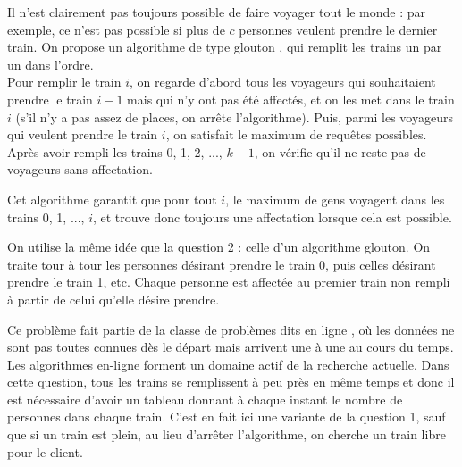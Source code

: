 

\Q
Il n'est clairement pas toujours possible de faire voyager tout le monde : par exemple, ce n'est pas possible si plus de $c$ personnes veulent prendre le dernier train. On propose un algorithme de type \og glouton \fg{}, qui remplit les trains un par un dans l'ordre.\\
Pour remplir le train $i$, on regarde d'abord tous les voyageurs qui souhaitaient prendre le train $i-1$ mais qui n'y ont pas été affectés, et on les met dans le train $i$ (s'il n'y a pas assez de places, on arrête l'algorithme). Puis, parmi les voyageurs qui veulent prendre le train $i$, on satisfait le maximum de requêtes possibles.\\
Après avoir rempli les trains 0, 1, 2, ..., $k-1$, on vérifie qu'il ne reste pas de voyageurs sans affectation.
\smallskip

Cet algorithme garantit que pour tout $i$, le maximum de gens voyagent dans les trains 0, 1, ..., $i$, et trouve donc toujours une affectation lorsque cela est possible.



\Q
On utilise la même idée que la question 2 : celle d'un algorithme glouton. On traite tour à tour les personnes désirant prendre le train 0, puis celles désirant prendre le train 1, etc. Chaque personne est affectée au premier train non rempli à partir de celui qu'elle désire prendre.



\Q
Ce problème fait partie de la classe de problèmes dits \og en ligne \fg{}, où les données ne sont pas toutes connues dès le départ mais arrivent une à une au cours du temps. Les algorithmes en-ligne forment un domaine actif de la recherche actuelle. Dans cette question, tous les trains se remplissent à peu près en même temps et donc il est nécessaire d'avoir un tableau donnant à chaque instant le nombre de personnes dans chaque train. C'est en fait ici une variante de la question 1, sauf que si un train est plein, au lieu d'arrêter l'algorithme, on cherche un train libre pour le client.



\Fin
